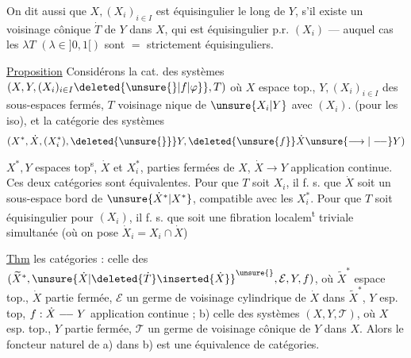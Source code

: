 On dit aussi que $X,(X_i)_{i\in I}$ est
 équisingulier
le long de $Y$, s'il existe un voisinage cônique
 $\dot T$ de $Y$ dans $X$, qui est équisingulier
p.r.  $(X_i)$ --- auquel cas les $\lambda T$
$(\lambda\in]0,1[)$ sont $=$ strictement équisinguliers.

\uline{Proposition} Considérons la cat. des
systèmes $(X,Y,(X_i)_{i\in I}\deleted{\unsure{\}|f|\varphi}},T)$ où
$X$ espace top., $Y,(X_i)_{i\in I}$ des sous-espaces fermés,
$T$ voisinage nique de $\unsure{X_i|Y}$
 avec
$(X_i)$. (pour les iso), et la catégorie
des systèmes
\[
(X^*,\dot X,(X_i^*),\deleted{\unsure{\}}}Y,
\deleted{\unsure{f}}\dot X\unsure{\longrightarrow|\mathrel{\relbar\joinrel\relbar}}Y)
\]
$X^*,Y$ espaces top\textsuperscript{s}, $\dot X$ et $X_i^*$, parties fermées de $X$,
$\dot X\longrightarrow Y$ application continue. Ces deux
catégories sont équivalentes.
Pour que $T$
soit \uline{} 
 $X_i$,
il f.  s. que $\dot X$ soit un sous-espace bord
de $\unsure{\dot X^*|X^*}$,  compatible avec les $X_i^*$.
Pour que $T$ soit équisingulier pour
$(X_i)$, il f.  s. que
soit une fibration localem\textsuperscript{t} triviale
simultanée (où on pose $\dot X_i=X_i\cap\dot X$)

\uline{Thm}  les  catégories  :
 celle des 
$(\widetilde X^*,{\unsure{\dot X|\deleted{\dot T}\inserted{\dot X}}}^{\unsure{}},\mathcal E,Y,f)$, où
$\widetilde X^*$ espace top., $\dot X$ partie fermée, $\mathcal E$ un germe
de voisinage cylindrique de $\dot X$ dans $\widetilde X^*$,
$Y$ esp. top, $f:\dot X\mathrel{\relbar\joinrel\relbar}Y$ application continue ;
b) celle des systèmes $(X,Y,\mathcal T)$, où
$X$ esp. top., $Y$ partie fermée, $\mathcal T$ un germe
de voisinage cônique de $Y$ dans $X$. 
 Alors le foncteur naturel  de a)
dans b) est une équivalence de catégories.

